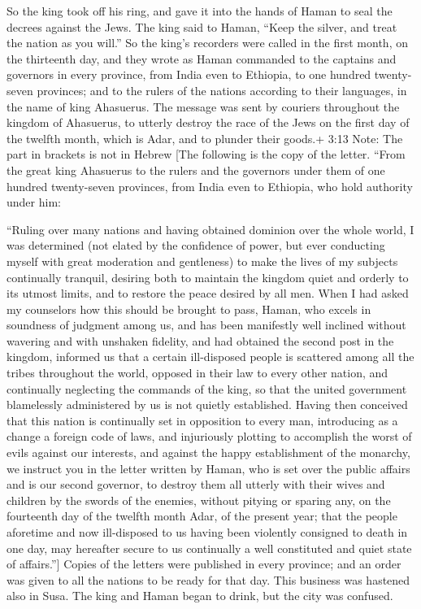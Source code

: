  So the king took off his ring, and gave it into the hands
of Haman to seal the decrees against the Jews.  The king
said to Haman, ``Keep the silver, and treat the nation as you will.''
 So the king's recorders were called in the first month, on
the thirteenth day, and they wrote as Haman commanded to the captains
and governors in every province, from India even to Ethiopia, to one
hundred twenty-seven provinces; and to the rulers of the nations
according to their languages, in the name of king Ahasuerus.
 The message was sent by couriers throughout the kingdom of
Ahasuerus, to utterly destroy the race of the Jews on the first day of
the twelfth month, which is Adar, and to plunder their goods.+ 3:13
Note: The part in brackets is not in Hebrew {[}The following is the copy
of the letter. ``From the great king Ahasuerus to the rulers and the
governors under them of one hundred twenty-seven provinces, from India
even to Ethiopia, who hold authority under him:

``Ruling over many nations and having obtained dominion over the whole
world, I was determined (not elated by the confidence of power, but ever
conducting myself with great moderation and gentleness) to make the
lives of my subjects continually tranquil, desiring both to maintain the
kingdom quiet and orderly to its utmost limits, and to restore the peace
desired by all men. When I had asked my counselors how this should be
brought to pass, Haman, who excels in soundness of judgment among us,
and has been manifestly well inclined without wavering and with unshaken
fidelity, and had obtained the second post in the kingdom, informed us
that a certain ill-disposed people is scattered among all the tribes
throughout the world, opposed in their law to every other nation, and
continually neglecting the commands of the king, so that the united
government blamelessly administered by us is not quietly established.
Having then conceived that this nation is continually set in opposition
to every man, introducing as a change a foreign code of laws, and
injuriously plotting to accomplish the worst of evils against our
interests, and against the happy establishment of the monarchy, we
instruct you in the letter written by Haman, who is set over the public
affairs and is our second governor, to destroy them all utterly with
their wives and children by the swords of the enemies, without pitying
or sparing any, on the fourteenth day of the twelfth month Adar, of the
present year; that the people aforetime and now ill-disposed to us
having been violently consigned to death in one day, may hereafter
secure to us continually a well constituted and quiet state of
affairs.''{]}  Copies of the letters were published in
every province; and an order was given to all the nations to be ready
for that day.  This business was hastened also in Susa. The
king and Haman began to drink, but the city was confused.

